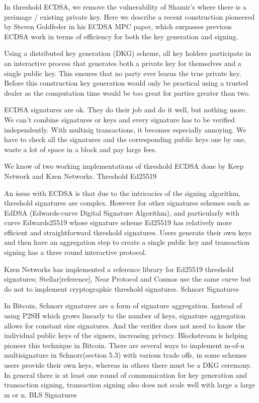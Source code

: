 In threshold ECDSA, we remove the vulnerability of Shamir’s where there is a preimage / existing private key. Here we describe a recent construction pioneered by Steven Goldfeder in his ECDSA MPC paper, which surpasses previous ECDSA work in terms of efficiency for both the key generation and signing.

Using a distributed key generation (DKG) scheme, all key holders participate in an interactive process that generates both a private key for themselves and a single public key. This ensures that no party ever learns the true private key. Before this construction key generation would only be practical using a trusted dealer as the computation time would be too great for parties greater than two.

ECDSA signatures are ok. They do their job and do it well, but nothing more. We can’t combine signatures or keys and every signature has to be verified independently. With multisig transactions, it becomes especially annoying. We have to check all the signatures and the corresponding public keys one by one, waste a lot of space in a block and pay large fees.

We know of two working implementations of threshold ECDSA done by Keep Network and Kzen Networks.
Threshold Ed25519

An issue with ECDSA is that due to the intricacies of the signing algorithm, threshold signatures are complex. However for other signatures schemes such as EdDSA (Edwards-curve Digital Signature Algorithm), and particularly with curve Edwards25519 whose signature scheme Ed25519 has relatively more efficient and straightforward threshold signatures. Users generate their own keys and then have an aggregation step to create a single public key and transaction signing has a three round interactive protocol.

Kzen Networks has implemented a reference library for Ed25519 threshold signatures; Stellar[reference], Near Protocol and Cosmos use the same curve but do not to implement cryptographic threshold signatures.
Schnorr Signatures

In Bitcoin, Schnorr signatures are a form of signature aggregation. Instead of using P2SH which grows linearly to the number of keys, signature aggregation allows for constant size signatures. And the verifier does not need to know the individual public keys of the signers, increasing privacy. Blockstream is helping pioneer this technique in Bitcoin.
There are several ways to implement m-of-n multisignature in Schnorr(section 5.3) with various trade offs, in some schemes users provide their own keys, whereas in others there must be a DKG ceremony. In general there is at least one round of communication for key generation and transaction signing, transaction signing also does not scale well with large a large m or n.
BLS Signatures

